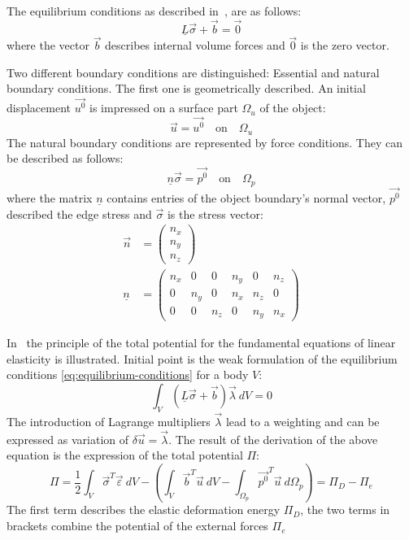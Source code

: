  The equilibrium conditions as described in~\cite{steinke2005finite}, are as follows:
 \begin{equation}\label{eq:equilibrium-conditions}
 \underline{L} \vec{\sigma} + \vec{b} = \vec{0}
 \end{equation}
 where the vector $\vec{b}$ describes internal volume forces and $\vec{0}$ is the zero vector.
 
 Two different boundary conditions are distinguished: Essential and natural boundary conditions. The first one is geometrically described. An initial displacement $\vec{u^0}$ is impressed on a surface part $\Omega_u$ of the object:
 \begin{equation}
 \vec{u} = \vec{u^0}\quad \text{on}\quad \Omega_u
 \end{equation}
 The natural boundary conditions are represented by force conditions. They can be described as follows:
 \begin{equation}
 \underline{n} \vec{\sigma} = \vec{p^0}\quad \text{on}\quad \Omega_p
 \end{equation}
 where the matrix $\underline{n}$ contains entries of the object boundary's normal vector, $\vec{p^0}$ described the edge stress and $\vec{\sigma}$ is the stress vector:
 \begin{align}
 \vec{n} &= \begin{pmatrix}
 n_x\\n_y\\n_z
 \end{pmatrix}\\
 \underline{n} &= \begin{pmatrix}
 n_x & 0 & 0 & n_y & 0 & n_z\\
 0 & n_y & 0 & n_x & n_z & 0\\
 0 & 0 & n_z & 0 & n_y & n_x
 \end{pmatrix}
 \end{align}
 
 In~\cite{steinke2005finite} the principle of the total potential for the fundamental equations of linear elasticity is illustrated. Initial point is the weak formulation of the equilibrium conditions \eqref{eq:equilibrium-conditions} for a body $V$:
 \begin{equation}
 \int_{V} \left(\underline{L} \vec{\sigma} + \vec{b}\right) \vec{\lambda}\ dV = 0
 \end{equation}
 The introduction of Lagrange multipliers $\vec{\lambda}$ lead to a weighting and can be expressed as variation of $\delta \vec{u} = \vec{\lambda}$. The result of the derivation of the above equation is the expression of the total potential $\Pi$:
 \begin{equation}
 \Pi = \frac{1}{2} \int_{V} \vec{\sigma}^T \vec{\varepsilon}\ dV - \left(\int_{V}\vec{b}^T \vec{u}\ dV - \int_{\Omega_p} \vec{p^0}^T \vec{u}\ d\Omega_p\right) = \Pi_D - \Pi_e
 \end{equation}
 The first term describes the elastic deformation energy $\Pi_D$, the two terms in brackets combine the potential of the external forces $\Pi_e$
 
